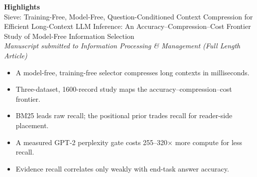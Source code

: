 \documentclass[12pt]{article}
\newcommand{\PaperTitle}{Sieve: Training-Free, Model-Free, Question-Conditioned
Context Compression for Efficient Long-Context LLM Inference: An
Accuracy--Compression--Cost Frontier Study of Model-Free Information Selection}
\begin{document}
\begin{center}
{\LARGE\bfseries Highlights}\\[0.6em]
{\large \PaperTitle{}\\[0.35em]}
{\normalsize\itshape Manuscript submitted to Information Processing \& Management
(Full Length Article)}
\end{center}

\vspace{1.2em}

\begin{itemize}[leftmargin=1.6em, itemsep=0.55em]
\item A model-free, training-free selector compresses long contexts in milliseconds.
\item Three-dataset, 1600-record study maps the accuracy--compression--cost frontier.
\item BM25 leads raw recall; the positional prior trades recall for reader-side placement.
\item A measured GPT-2 perplexity gate costs 255--320$\times$ more compute for less recall.
\item Evidence recall correlates only weakly with end-task answer accuracy.
\end{itemize}
\end{document}
